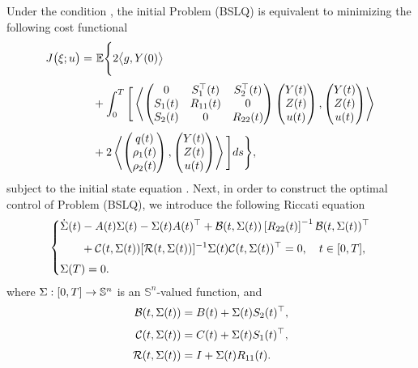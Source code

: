 \documentclass[11pt,times,twoside]{article}
\def\dbE{\mathbb{E}} \def\sE{\mathscr{E}} \def\fE{\mathfrak{E}} \def\cE{{\cal E}} \def\BE{{\bf E}} \def\Be{{\bf e}}
\begin{document}
Under the condition , the initial Problem (BSLQ) is equivalent to minimizing the following cost functional
%
\begin{equation}\label{4.2}
\begin{aligned}
\ds J\big(\xi;u\big)=&~\dbE\Bigg\{2\big\lan g,Y(0)\big\ran\\
%
\ns\ds& +\int_0^T\Bigg[
\llan\begin{pmatrix}0&S_1^\top(t)&S_2^\top(t)\\S_1(t)&R_{11}(t)&0\\S_2(t)&0&R_{22}(t) \end{pmatrix}
\begin{pmatrix}Y(t)\\Z(t)\\u(t)\end{pmatrix},
\begin{pmatrix}Y(t)\\Z(t)\\u(t)\end{pmatrix}\rran \\
%
\ns\ds & +2\llan\begin{pmatrix}q(t)\\ \rho_1(t)\\ \rho_2(t) \end{pmatrix},
   \begin{pmatrix}Y(t)\\Z(t)\\u(t)\end{pmatrix}\rran\Bigg] ds\Bigg\},
%
\end{aligned}
\end{equation}
%
subject to the initial state equation . Next, in order to construct the optimal control of Problem (BSLQ), we introduce the following Riccati equation
%
\begin{equation}\label{Riccati}
\left\{\begin{aligned}
\ds & \dot{\Si}(t) -A(t) \Si(t)-\Si(t) A(t)^{\top}+\mathcal{B}(t, \Si(t))\left[R_{22}(t)\right]^{-1} \mathcal{B}(t,\Si(t))^{\top} \\
\ns\ds &\hp{\dot{\Si}(t)} +\mathcal{C}(t, \Si(t))[\mathcal{R}(t, \Si(t))]^{-1} \Si(t) \mathcal{C}(t, \Si(t))^{\top}=0, \q t\in[0,T], \\
\ns\ds & \Si(T)=0 .
\end{aligned}\right.
\end{equation}
%
where $\Sigma:[0, T] \rightarrow \mathbb{S}^{n}$ is an $\mathbb{S}^{n}$-valued function, and
%
\begin{align*}
\ds \mathcal{B}(t, \Si(t)) &= B(t)+\Si(t) S_{2}(t)^{\top}, \\
\ns\ds \mathcal{C}(t, \Si(t)) &= C(t)+\Si(t) S_{1}(t)^{\top}, \\
\ns\ds \mathcal{R}(t, \Si(t)) &= I+\Si(t) R_{11}(t).
\end{align*}
\end{document}
